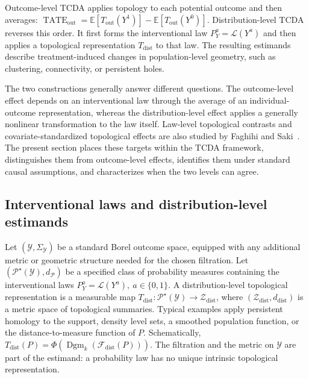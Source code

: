 \documentclass[11pt,a4paper]{article}
\theoremstyle{plain}
\theoremstyle{definition}
\theoremstyle{remark}
\newcommand{\1}{\mathbbm{1}}
\begin{document}
Outcome-level TCDA applies topology to each potential outcome and then averages: \(\operatorname{TATE}_{\mathrm{out}} = \mathbb E[T_{\mathrm{out}}(Y^1)] - \mathbb E[T_{\mathrm{out}}(Y^0)]\). Distribution-level TCDA reverses this order. It first forms the interventional law \(P_Y^a=\mathcal L(Y^a)\) and then applies a topological representation \(T_{\mathrm{dist}}\) to that law. The resulting estimands describe treatment-induced changes in population-level geometry, such as clustering, connectivity, or persistent holes.

The two constructions generally answer different questions. The outcome-level effect depends on an interventional law through the average of an individual-outcome representation, whereas the distribution-level effect applies a generally nonlinear transformation to the law itself. Law-level topological contrasts and covariate-standardized topological effects are also studied by Faghihi and Saki~\citep{sakifaghihi2026}. The present section places these targets within the TCDA framework, distinguishes them from outcome-level effects, identifies them under standard causal assumptions, and characterizes when the two levels can agree.

\subsection{Interventional laws and distribution-level estimands}
\label{subsec:interventional-laws}

Let \((\mathcal Y,\Sigma_{\mathcal Y})\) be a standard Borel outcome space, equipped with any additional metric or geometric structure needed for the chosen filtration. Let
\((\mathcal P^\star(\mathcal Y),d_{\mathcal P})\) be a specified class of probability measures containing the interventional laws \(P_Y^a=\mathcal L(Y^a),\  a\in\{0,1\}\). A distribution-level topological representation is a measurable map \(T_{\mathrm{dist}}: \mathcal P^\star(\mathcal Y) \longrightarrow \mathcal Z_{\mathrm{dist}}\), where \((\mathcal Z_{\mathrm{dist}},d_{\mathrm{dist}})\) is a metric
space of topological summaries. Typical examples apply persistent homology to the support, density level sets, a smoothed population function, or the distance-to-measure function of \(P\). Schematically,
\(T_{\mathrm{dist}}(P) = \Phi\!\left(
\operatorname{Dgm}_k( \mathcal F_{\mathrm{dist}}(P))
\right)\). The filtration and the metric on \(\mathcal Y\) are part of the estimand: a probability law has no unique intrinsic topological representation.
\end{document}
